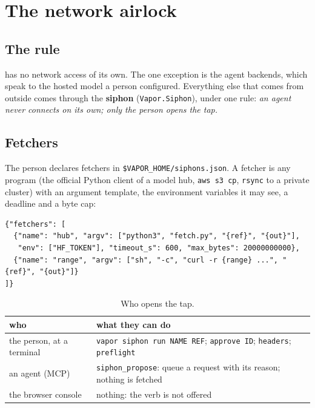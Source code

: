 \chapter{The network airlock}\label{ch:network}

\section{The rule}

\vapor{} has no network access of its own. The one exception is the agent backends, which speak to the
hosted model a person configured. Everything else that comes from outside comes through the
\textbf{siphon} (\texttt{Vapor.Siphon}), under one rule: \emph{an agent never connects on its own; only
the person opens the tap.}

\section{Fetchers}

The person declares fetchers in \texttt{\$VAPOR\_HOME/siphons.json}. A fetcher is any program (the
official Python client of a model hub, \texttt{aws s3 cp}, \texttt{rsync} to a private cluster) with an
argument template, the environment variables it may see, a deadline and a byte cap:

\begin{lstlisting}
{"fetchers": [
  {"name": "hub", "argv": ["python3", "fetch.py", "{ref}", "{out}"],
   "env": ["HF_TOKEN"], "timeout_s": 600, "max_bytes": 20000000000},
  {"name": "range", "argv": ["sh", "-c", "curl -r {range} ...", "{ref}", "{out}"]}
]}
\end{lstlisting}

\begin{table}[h]
\centering\small
\begin{tabularx}{\textwidth}{@{}lX@{}}
\toprule
who & what they can do \\
\midrule
the person, at a terminal & \texttt{vapor siphon run NAME REF}; \texttt{approve ID}; \texttt{headers}; \texttt{preflight} \\
an agent (MCP) & \texttt{siphon\_propose}: queue a request with its reason; nothing is fetched \\
the browser console & nothing: the verb is not offered \\
\bottomrule
\end{tabularx}
\caption{Who opens the tap.}
\end{table}

